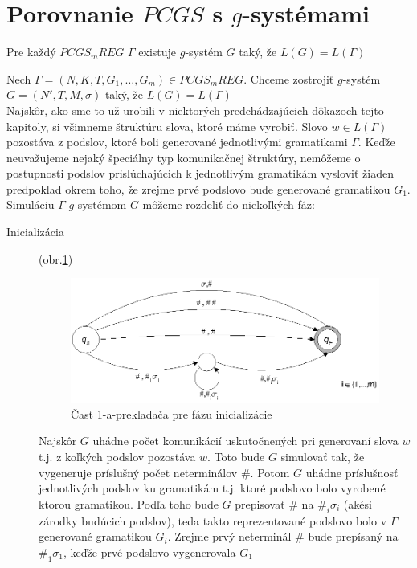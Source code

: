 \section{Porovnanie $PCGS$ s $g$-systémami}

\begin{veta}
Pre každý $PCGS_mREG$ $\Gamma$ existuje $g$-systém $G$ taký, že
$L(G)=L(\Gamma)$
\end{veta}

\begin{dokaz}
Nech $\Gamma=(N,K,T,G_1,\dots ,G_m)\in PCGS_mREG$. Chceme
zostrojiť $g$-systém $G=(N',T,M,\sigma)$ taký, že $L(G)=L(\Gamma)$
\\ Najskôr, ako sme to už urobili v niektorých predchádzajúcich
dôkazoch tejto kapitoly, si všimneme štruktúru slova, ktoré máme
vyrobiť. Slovo $w\in L(\Gamma)$ pozostáva z podslov, ktoré boli
generované jednotlivými gramatikami $\Gamma$. Keďže neuvažujeme
nejaký špeciálny typ komunikačnej štruktúry, nemôžeme o
postupnosti podslov prislúchajúcich k jednotlivým gramatikám
vysloviť žiaden predpoklad okrem toho, že zrejme prvé podslovo
bude generované gramatikou $G_1$.
\\ Simuláciu $\Gamma$ $g$-systémom $G$ môžeme rozdeliť do
niekoľkých fáz:
\begin{description}
  \item[Inicializácia] (obr.\ref{pcgsgs1})

\begin{figure}[ht]
  \centering
  \includegraphics{img/pcgsgs/pcgsgs1}
  \caption{Časť 1-a-prekladača pre fázu inicializácie}\label{pcgsgs1}
\end{figure}

  Najskôr $G$ uhádne počet komunikácií uskutočnených pri
  generovaní slova $w$ t.j. z koľkých podslov pozostáva $w$. Toto
  bude $G$ simulovať tak, že vygeneruje príslušný počet neterminálov $\#$.
  Potom $G$ uhádne príslušnosť jednotlivých podslov ku gramatikám
  t.j. ktoré podslovo bolo vyrobené ktorou gramatikou. Podľa toho
  bude $G$ prepisovať $\#$ na $\#_i\sigma_i$ (akési zárodky budúcich podslov),
  teda takto reprezentované podslovo bolo v $\Gamma$ generované gramatikou
  $G_i$. Zrejme prvý neterminál $\#$ bude prepísaný na $\#_1\sigma_1$, keďže
  prvé podslovo vygenerovala $G_1$


\end{description}
\end{dokaz}
